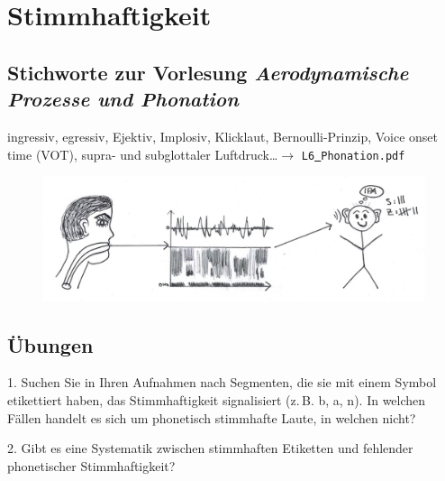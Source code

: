 \chapter{Stimmhaftigkeit}

\section{Stichworte zur Vorlesung \em{Aerodynamische Prozesse und Phonation}}

ingressiv, egressiv, Ejektiv, Implosiv, Klicklaut, Bernoulli-Prinzip, Voice onset time (VOT), supra- und subglottaler Luftdruck\dots $\rightarrow$ {\tt L6\underline{\ }Phonation.pdf}

\begin{figure}[htbp]
\begin{center}
\includegraphics[width=\textwidth]{grafiken/stimmhaftigkeit/stimmhaftigkeit.jpg}
\label{t4}
\end{center}
\end{figure}


\newpage
\section{Übungen}

1.	Suchen Sie in Ihren Aufnahmen nach Segmenten, die sie mit einem Symbol etikettiert haben, das Stimmhaftigkeit signalisiert (z.\,B. b, a, n). In welchen Fällen handelt es sich um phonetisch stimmhafte Laute, in welchen nicht?
\vspace{4cm}

2.	Gibt es eine Systematik zwischen stimmhaften Etiketten und fehlender phonetischer Stimmhaftigkeit?
\vspace{4cm}
